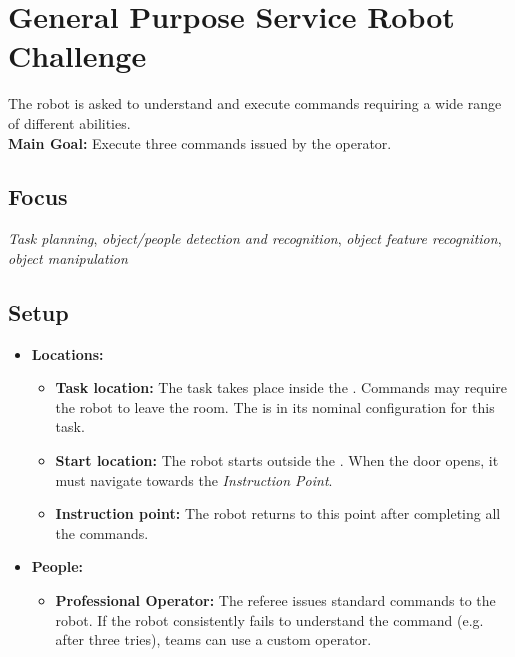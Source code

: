 \section{General Purpose Service Robot Challenge}\label{test:gpsr}

The robot is asked to understand and execute commands requiring a wide range of different abilities. \\

\noindent \textbf{Main Goal:} Execute three commands issued by the operator.\\

\subsection*{Focus}
\emph{Task planning}, \emph{object/people detection and recognition}, \emph{object feature recognition}, \emph{object manipulation}

\subsection*{Setup}
\begin{itemize}[nosep]
    \item \textbf{Locations:}
        \begin{itemize}
            \item \textbf{Task location:} The task takes place inside the \Arena{}. Commands may require the robot to leave the room. The \Arena{} is in its nominal configuration for this task.
            \item \textbf{Start location:} The robot starts outside the \Arena{}. When the door opens, it must navigate towards the \textit{Instruction Point}.
            \item \textbf{Instruction point:} The robot returns to this point after completing all the commands.
        \end{itemize}
    \item \textbf{People:}
        \begin{itemize}
			\item \textbf{Professional Operator:} The referee issues standard commands to the robot.
            If the robot consistently fails to understand the command (e.g. after three tries), teams can use a custom operator.
        \end{itemize}
\end{itemize}


